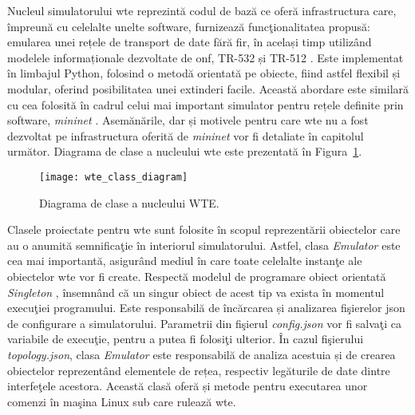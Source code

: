 Nucleul simulatorului \gls{wte} reprezintă codul de bază ce oferă infrastructura care, împreună cu celelalte unelte software, furnizează funcţionalitatea propusă: emularea unei rețele de transport de date fără fir, în același timp utilizând modelele informaționale dezvoltate de \gls{onf}, TR-532 și TR-512 \cite{onftr532, onftr512v1.2}. Este implementat în limbajul Python, folosind o metodă orientată pe obiecte, fiind astfel flexibil și modular, oferind posibilitatea unei extinderi facile. Această abordare este similară cu cea folosită în cadrul celui mai important simulator pentru rețele definite prin software, \textit{mininet} \cite{lantz2010network, brandonheller2013}. Asemănările, dar și motivele pentru care \gls{wte} nu a fost dezvoltat pe infrastructura oferită de \textit{mininet} vor fi detaliate în capitolul următor. Diagrama de clase a nucleului \gls{wte} este prezentată în Figura~\ref{fig:wte_class_diagram}.

\begin{figure}[h]
	\centering
	\texttt{[image: wte\_class\_diagram]}
	\caption{Diagrama de clase a nucleului WTE.}
	\label{fig:wte_class_diagram}
\end{figure}

Clasele proiectate pentru \gls{wte} sunt folosite în scopul reprezentării obiectelor care au o anumită semnificaţie în interiorul simulatorului. Astfel, clasa \textit{Emulator} este cea mai importantă, asigurând mediul în care toate celelalte instanţe ale obiectelor \gls{wte} vor fi create. Respectă modelul de programare obiect orientată \textit{Singleton} \cite{wolfgang1994design}, însemnând că un singur obiect de acest tip va exista în momentul execuţiei programului. Este responsabilă de încărcarea și analizarea fişierelor \gls{json} de configurare a simulatorului. Parametrii din fişierul \textit{config.json} vor fi salvaţi ca variabile de execuţie, pentru a putea fi folosiţi ulterior. În cazul fişierului \textit{topology.json}, clasa \textit{Emulator} este responsabilă de analiza acestuia și de crearea obiectelor reprezentând elementele de rețea, respectiv legăturile de date dintre interfeţele acestora. Această clasă oferă și metode pentru executarea unor comenzi în maşina Linux sub care rulează \gls{wte}.

